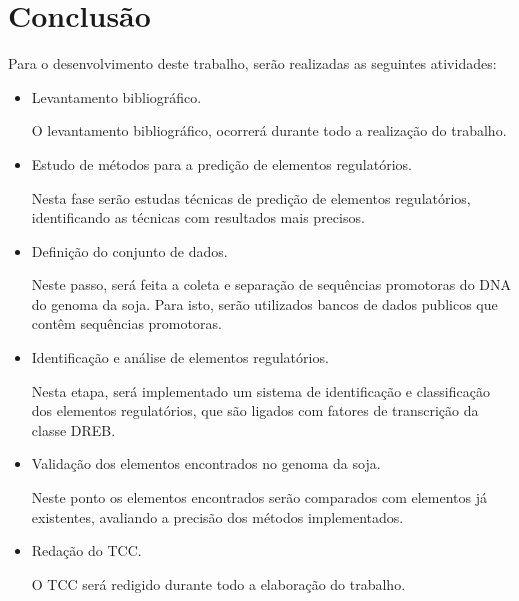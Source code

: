 \chapter{Conclusão}

Para o desenvolvimento deste trabalho, serão realizadas as seguintes atividades:

\begin{itemize}
\item Levantamento bibliográfico.

O levantamento bibliográfico, ocorrerá durante todo a realização do trabalho.

\item Estudo de métodos para a predição de elementos regulatórios.

Nesta fase serão estudas técnicas de predição de elementos regulatórios, identificando as técnicas com resultados mais precisos.

\item Definição do conjunto de dados.

Neste passo, será feita a coleta e separação de sequências promotoras do DNA do genoma da soja. Para isto, serão utilizados bancos de dados publicos que contêm sequências promotoras.

\item Identificação e análise de elementos regulatórios.

Nesta etapa, será implementado um sistema de identificação e classificação dos elementos regulatórios, que são ligados com fatores de transcrição da classe DREB.

\item Validação dos elementos encontrados no genoma da soja.

Neste ponto os elementos encontrados serão comparados com elementos já existentes, avaliando a precisão dos métodos implementados.

\item Redação do TCC.

O TCC será redigido durante todo a elaboração do trabalho.

\end{itemize}

